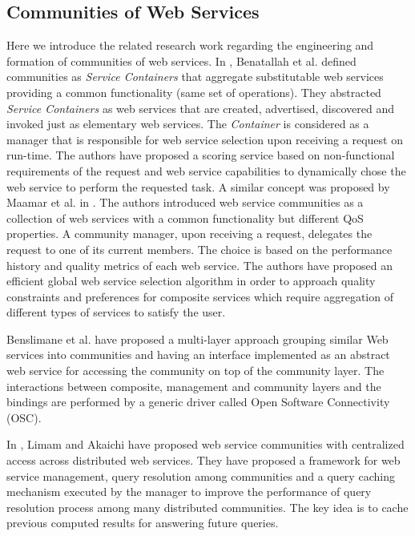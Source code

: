 \subsection{Communities of Web Services}\label{sec:communities_rel}

Here we introduce the related research work regarding the engineering and formation
of communities of web services. In \cite{DBLP:journals/internet/BenatallahSD03}, Benatallah et al.
defined communities as \emph{Service Containers} that aggregate
substitutable web services providing a common functionality (same
set of operations). They abstracted \emph{Service Containers} as
web services that are created, advertised, discovered and invoked
just as elementary web services. The \emph{Container} is
considered as a manager that is responsible for web service
selection upon receiving a request on run-time. The authors have
proposed a scoring service based on non-functional requirements of
the request and web service capabilities to dynamically chose the
web service to perform the requested task. A similar concept was
proposed by Maamar et al. in
\cite{DBLP:journals/ijebr/MaamarSTBB09}. The authors introduced
web service communities as a collection of web services with a
common functionality but different QoS properties. A community
manager, upon receiving a request, delegates the request to one of
its current members. The choice is based on the performance
history and quality metrics of each web service. The authors have
proposed an efficient global web service selection algorithm in
order to approach quality constraints and preferences for
composite services which require aggregation of different types of
services to satisfy the user.

Benslimane et al. \cite{Liris-2770} have proposed a multi-layer
approach grouping similar Web services into communities and having
an interface implemented as an abstract web service for accessing
the community on top of the community layer. The interactions
between composite, management and community layers and the
bindings are performed by a generic driver called Open Software
Connectivity (OSC).

In \cite{managing-hela-jalel}, Limam and Akaichi have proposed web
service communities with centralized access across distributed web
services. They have proposed a framework for web service
management, query resolution among communities and a query caching
mechanism executed by the manager to improve the performance of
query resolution process among many distributed communities. The
key idea is to cache previous computed results for answering
future queries.


